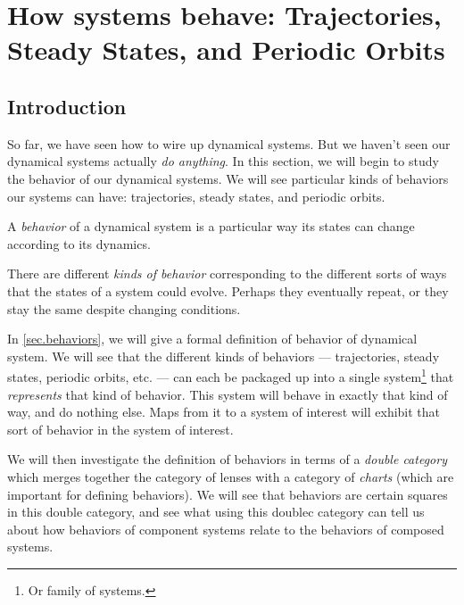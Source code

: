 \documentclass[DynamicalBook]{subfiles}
\begin{document}
%


\setcounter{chapter}{2}%


\chapter{How systems behave: Trajectories, Steady States, and Periodic Orbits}\label{chapter.2}

\section{Introduction}

So far, we have seen how to wire up dynamical systems. But we haven't seen our
dynamical systems actually \emph{do anything}. In this section, we will begin to
study the behavior of our dynamical systems. We will see particular kinds of
behaviors our systems can have:
trajectories, steady states, and periodic orbits.

\begin{informal}
  A \emph{behavior} of a dynamical system is a particular way its states can
  change according to its dynamics.  

  There are different \emph{kinds of behavior} corresponding to the different
  sorts of ways that the states of a system could evolve. Perhaps they eventually
  repeat, or they stay the same despite changing conditions.
\end{informal}

In \cref{sec.behaviors}, we will give a formal definition of behavior of
dynamical system. We will see that the different kinds of behaviors ---
trajectories, steady states, periodic orbits, etc. --- can each
be packaged up into a single system\footnote{Or family of systems.} that \emph{represents} that kind of
behavior. This system will behave in exactly that kind of way, and do nothing else. Maps from it to a system of interest will exhibit that sort of behavior in the system of interest.

We will then investigate the definition of behaviors in terms of a \emph{double
  category} which merges together the category of lenses with a category of
\emph{charts} (which are important for defining behaviors). We will see that
behaviors are certain squares in this double category, and see what using this
doublec category can tell us about how behaviors of component systems relate to
the behaviors of composed systems. 


\end{document}
